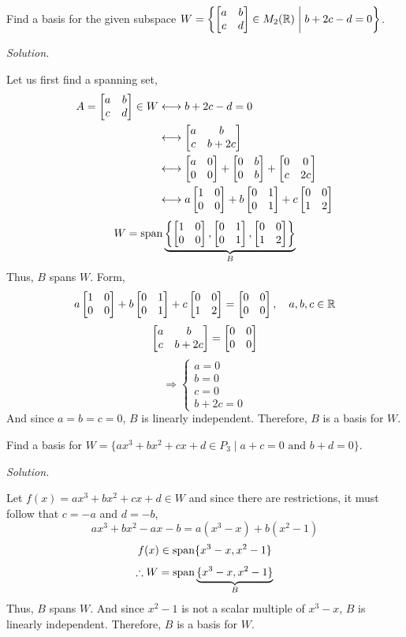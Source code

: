 \newpage
\begin{example}
Find a basis for the given subspace $W = \left\{\bmat{a & b \\ c & d} \in M_2(\RR) \suchthat b + 2c - d = 0\right\}$.

\textit{Solution.}

Let us first find a spanning set,
\begin{align*}
    A = \begin{bmatrix} a & b \\ c & d \end{bmatrix} \in W &\longleftrightarrow  b+ 2c - d = 0 \\
    &\longleftrightarrow \begin{bmatrix} a & b \\ c & b + 2c \end{bmatrix} \\
    &\longleftrightarrow \begin{bmatrix} a & 0 \\ 0 & 0  \end{bmatrix} + \begin{bmatrix} 0 & b \\ 0 & b \end{bmatrix} + \begin{bmatrix} 0 & 0 \\ c & 2c \end{bmatrix} \\
    &\longleftrightarrow a\begin{bmatrix} 1 & 0 \\ 0 & 0 \end{bmatrix} + b\begin{bmatrix} 0 & 1 \\ 0 & 1 \end{bmatrix} + c\begin{bmatrix} 0 & 0 \\ 1 & 2 \end{bmatrix}
\end{align*}
$$W = \operatorname{span}\underbrace{\left\{\begin{bmatrix} 1 & 0 \\ 0 & 0 \end{bmatrix}, \begin{bmatrix} 0 & 1 \\ 0 & 1 \end{bmatrix}, \begin{bmatrix} 0 & 0 \\ 1 & 2 \end{bmatrix}\right\}}_B$$
Thus, $B$ spans $W$. Form,
$$a\begin{bmatrix} 1 & 0 \\ 0 & 0 \end{bmatrix} + b\begin{bmatrix} 0 & 1\\ 0 & 1 \end{bmatrix} + c\begin{bmatrix} 0 & 0 \\ 1 & 2 \end{bmatrix} = \begin{bmatrix} 0 & 0 \\ 0 & 0 \end{bmatrix}, \quad a, b, c \in \mathbb{R}$$
$$\begin{bmatrix} a & b \\ c & b + 2c \end{bmatrix} = \begin{bmatrix} 0 & 0 \\ 0 & 0 \end{bmatrix}$$
$$\Longrightarrow \begin{cases}
    a = 0 \\ 
    b = 0 \\
    c = 0 \\
    b + 2c = 0
\end{cases}$$
And since $a = b = c = 0$, $B$ is linearly independent. Therefore, $B$ is a basis for $W$.
\end{example}

\begin{example}
Find a basis for $W = \{ax^3 + bx^2 + cx + d \in P_3 \mid a + c = 0 \text{ and } b + d = 0\}$.

\textit{Solution.}

Let $f(x) = ax^3 + bx^2 + cx + d \in W$ and since there are restrictions, it must follow that $c = -a$ and $d = -b$,
$$ax^3 + bx^2 -ax -b = a(x^3 - x) + b(x^2 - 1)$$
$$f(x) \in \operatorname{span}\{x^3 - x, x^2 - 1\}$$
$$\therefore W = \operatorname{span}\underbrace{\{x^3 - x, x^2 - 1\}}_B$$
Thus, $B$ spans $W$. And since $x^2 - 1$ is not a scalar multiple of $x^3 - x$, $B$ is linearly independent. Therefore, $B$ is a basis for $W$.
\end{example}

